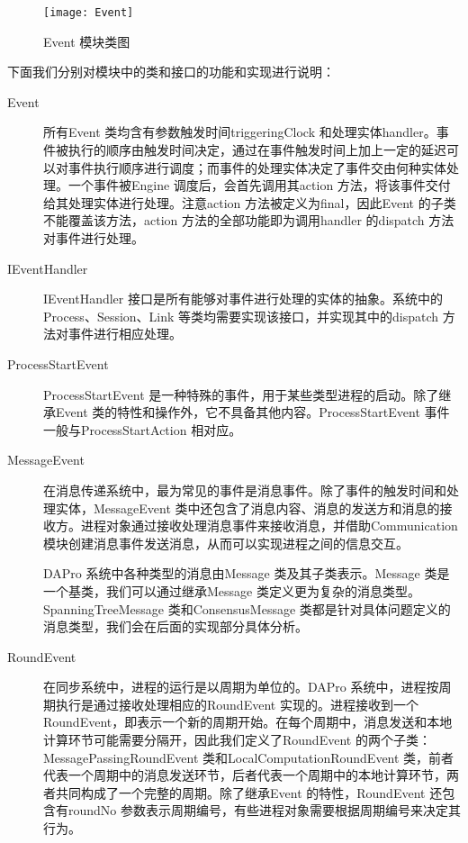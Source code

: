     \begin{figure}[ht]
        \centering
        \texttt{[image: Event]}\\
        \caption{Event 模块类图}\label{Event}
    \end{figure}

    下面我们分别对模块中的类和接口的功能和实现进行说明：
    \begin{description}
      \item[Event] 所有Event 类均含有参数触发时间triggeringClock 和处理实体handler。事件被执行的顺序由触发时间决定，通过在事件触发时间上加上一定的延迟可以对事件执行顺序进行调度；而事件的处理实体决定了事件交由何种实体处理。一个事件被Engine 调度后，会首先调用其action 方法，将该事件交付给其处理实体进行处理。注意action 方法被定义为final，因此Event 的子类不能覆盖该方法，action 方法的全部功能即为调用handler 的dispatch 方法对事件进行处理。
      \item[IEventHandler] IEventHandler 接口是所有能够对事件进行处理的实体的抽象。系统中的Process、Session、Link 等类均需要实现该接口，并实现其中的dispatch 方法对事件进行相应处理。
      \item[ProcessStartEvent] ProcessStartEvent 是一种特殊的事件，用于某些类型进程的启动。除了继承Event 类的特性和操作外，它不具备其他内容。ProcessStartEvent 事件一般与ProcessStartAction 相对应。
      \item[MessageEvent] 在消息传递系统中，最为常见的事件是消息事件。除了事件的触发时间和处理实体，MessageEvent 类中还包含了消息内容、消息的发送方和消息的接收方。进程对象通过接收处理消息事件来接收消息，并借助Communication 模块创建消息事件发送消息，从而可以实现进程之间的信息交互。
          
          DAPro 系统中各种类型的消息由Message 类及其子类表示。Message 类是一个基类，我们可以通过继承Message 类定义更为复杂的消息类型。SpanningTreeMessage 类和ConsensusMessage 类都是针对具体问题定义的消息类型，我们会在后面的实现部分具体分析。
      \item[RoundEvent] 在同步系统中，进程的运行是以周期为单位的。DAPro 系统中，进程按周期执行是通过接收处理相应的RoundEvent 实现的。进程接收到一个RoundEvent，即表示一个新的周期开始。在每个周期中，消息发送和本地计算环节可能需要分隔开，因此我们定义了RoundEvent 的两个子类：MessagePassingRoundEvent 类和LocalComputationRoundEvent 类，前者代表一个周期中的消息发送环节，后者代表一个周期中的本地计算环节，两者共同构成了一个完整的周期。除了继承Event 的特性，RoundEvent 还包含有roundNo 参数表示周期编号，有些进程对象需要根据周期编号来决定其行为。
    \end{description}

